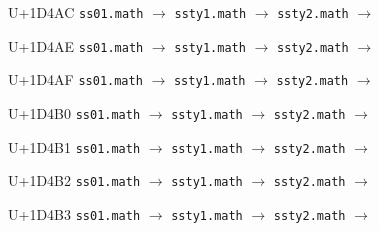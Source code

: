 \documentclass{article}
\begin{document}
\begin{substitutions}
\goodbreak

U+1D4AC  \linebreak
    \texttt{ss01.math} $\to$  \linebreak
    \texttt{ssty1.math} $\to$  \linebreak
    \texttt{ssty2.math} $\to$  

\goodbreak

U+1D4AE  \linebreak
    \texttt{ss01.math} $\to$  \linebreak
    \texttt{ssty1.math} $\to$  \linebreak
    \texttt{ssty2.math} $\to$  

\goodbreak

U+1D4AF  \linebreak
    \texttt{ss01.math} $\to$  \linebreak
    \texttt{ssty1.math} $\to$  \linebreak
    \texttt{ssty2.math} $\to$  

\goodbreak

U+1D4B0  \linebreak
    \texttt{ss01.math} $\to$  \linebreak
    \texttt{ssty1.math} $\to$  \linebreak
    \texttt{ssty2.math} $\to$  

\goodbreak

U+1D4B1  \linebreak
    \texttt{ss01.math} $\to$  \linebreak
    \texttt{ssty1.math} $\to$  \linebreak
    \texttt{ssty2.math} $\to$  

\goodbreak

U+1D4B2  \linebreak
    \texttt{ss01.math} $\to$  \linebreak
    \texttt{ssty1.math} $\to$  \linebreak
    \texttt{ssty2.math} $\to$  

\goodbreak

U+1D4B3  \linebreak
    \texttt{ss01.math} $\to$  \linebreak
    \texttt{ssty1.math} $\to$  \linebreak
    \texttt{ssty2.math} $\to$  


\end{substitutions}
\end{document}
